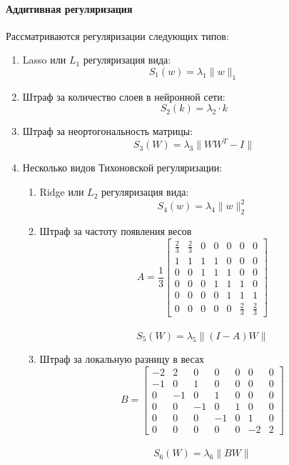 \documentclass[12pt, twoside]{article}
\begin{document}
\paragraph{Аддитивная регуляризация}
Рассматриваются регуляризации следующих типов:
\begin{enumerate}[label*=\arabic*.]
    \item
    Lasso или $L_1$ регуляризация вида:
    \[S_1(w) = \lambda_1\|w\|_1\]
    \item
    Штраф за количество слоев в нейронной сети:
    \[S_2(k) = \lambda_2 \cdot k\]
    \item
    Штраф за неортогональность матрицы:
    \[S_3(W) = \lambda_3\|WW^T - I\|\]
    \item 
    Несколько видов Тихоновской регуляризации:
    \begin{enumerate}[label*=\arabic*.]
        \item
        Ridge или $L_2$ регуляризация вида:
        \[S_4(w) = \lambda_4\|w\|_2^2\]
        \item
        Штраф за частоту появления весов
        \[
        A = \frac{1}{3} \begin{bmatrix}
            \frac{2}{3}& \frac{2}{3} & 0 & 0 &0 &0& 0\\
            1 & 1 & 1 & 1& 0 & 0 & 0 \\
            0& 0& 1 & 1& 1 & 0 & 0 \\
            0& 0& 0 & 1& 1 & 1 & 0 \\
            0& 0& 0 & 0& 1 & 1 & 1\\
            0& 0& 0 & 0 & 0& \frac{2}{3}& \frac{2}{3}
        \end{bmatrix}
        \]
        \\
        
        \[S_5(W) = \lambda_5 \|(I -A)W\|\]
        \item 
        Штраф за локальную разницу в весах
        \[
        B = \begin{bmatrix}
            -2& 2 & 0 & 0 & 0 &0 &0\\
            -1 & 0 & 1 & 0& 0 & 0 & 0 \\
            0& -1& 0 & 1& 0 & 0 & 0 \\
            0& 0& -1 & 0& 1 & 0 & 0 \\
            0& 0& 0 & -1& 0 & 1 & 0\\
            0& 0& 0 & 0 & 0& -2& 2
        \end{bmatrix}
        \]
        \\
        \[S_6(W) = \lambda_6 \|BW\|\]
    \end{enumerate}
\end{enumerate}
\end{document}

